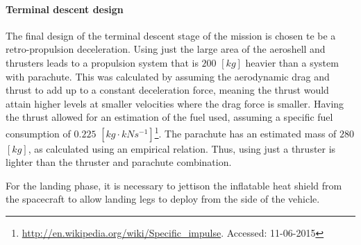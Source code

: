 \paragraph{Terminal descent design}
The final design of the terminal descent stage of the mission is chosen te be a retro-propulsion deceleration. Using just the large area of the aeroshell and thrusters leads to a propulsion system that is $200$ $[kg]$ heavier than a system with parachute. This was calculated by assuming the aerodynamic drag and thrust to add up to a constant deceleration force, meaning the thrust would attain higher levels at smaller velocities where the drag force is smaller. Having the thrust allowed for an estimation of the fuel used, assuming a specific fuel consumption of $0.225$ $[kg \cdot kN s^{-1}]$\footnote{\url{http://en.wikipedia.org/wiki/Specific_impulse}. Accessed: 11-06-2015}. The parachute has an estimated mass of $280$ $[kg]$, as calculated using an empirical relation. Thus, using just a thruster is lighter than the thruster and parachute combination.

For the landing phase, it is necessary to jettison the inflatable heat shield from the spacecraft to allow landing legs to deploy from the side of the vehicle.